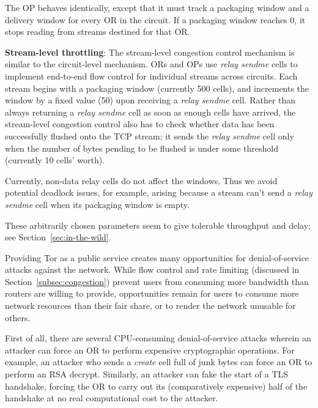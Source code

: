 \documentclass[times,10pt,twocolumn]{article}
\begin{document}
The OP behaves identically, except that it must track a packaging window
and a delivery window for every OR in the circuit. If a packaging window
reaches 0, it stops reading from streams destined for that OR.

\textbf{Stream-level throttling}:
The stream-level congestion control mechanism is similar to the
circuit-level mechanism. ORs and OPs use \emph{relay sendme} cells
to implement end-to-end flow control for individual streams across
circuits. Each stream begins with a packaging window (currently 500 cells),
and increments the window by a fixed value (50) upon receiving a \emph{relay
sendme} cell. Rather than always returning a \emph{relay sendme} cell as soon
as enough cells have arrived, the stream-level congestion control also
has to check whether data has been successfully flushed onto the TCP
stream; it sends the \emph{relay sendme} cell only when the number of bytes pending
to be flushed is under some threshold (currently 10 cells' worth).

Currently, non-data relay cells do not affect the windows. Thus we
avoid potential deadlock issues, for example, arising because a stream
can't send a \emph{relay sendme} cell when its packaging window is empty.

These arbitrarily chosen parameters seem to give tolerable throughput
and delay; see Section~\ref{sec:in-the-wild}.


\label{subsec:dos}

Providing Tor as a public service creates many opportunities for
denial-of-service attacks against the network.  While
flow control and rate limiting (discussed in
Section~\ref{subsec:congestion}) prevent users from consuming more
bandwidth than routers are willing to provide, opportunities remain for
users to
consume more network resources than their fair share, or to render the
network unusable for others.

First of all, there are several CPU-consuming denial-of-service
attacks wherein an attacker can force an OR to perform expensive
cryptographic operations.  For example, an attacker who sends a
\emph{create} cell full of junk bytes can force an OR to perform an RSA
decrypt.  Similarly, an attacker can
fake the start of a TLS handshake, forcing the OR to carry out its
(comparatively expensive) half of the handshake at no real computational
cost to the attacker.
\end{document}
